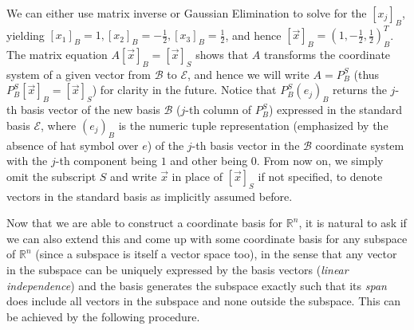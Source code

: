 \begin{solution}
We can either use matrix inverse or Gaussian Elimination to solve for the $[x_j]_B$, yielding $[x_1]_B = 1, [x_2]_B = -\frac{1}{2}, [x_3]_B = \frac{1}{2}$, and hence $[\vec{x}]_B = (1, -\frac{1}{2}, \frac{1}{2})^T_B$. The matrix equation $A[\vec{x}]_B = [\vec{x}]_S$ shows that $A$ transforms the coordinate system of a given vector from $\mathcal{B}$ to $\mathcal{E}$, and hence we will write $A = P_B^S$ (thus $P_B^S [\vec{x}]_B = [\vec{x}]_S$) for clarity in the future. Notice that $P_B^S (e_j)_B$ returns the $j$-th basis vector of the new basis $\mathcal{B}$ ($j$-th column of $P_B^S$) expressed in the standard basis $\mathcal{E}$, where $(e_j)_B$ is the numeric tuple representation (emphasized by the absence of hat symbol over $e$) of the $j$-th basis vector in the $\mathcal{B}$ coordinate system with the $j$-th component being $1$ and other being $0$. From now on, we simply omit the subscript $S$ and write $\vec{x}$ in place of $[\vec{x}]_S$ if not specified, to denote vectors in the standard basis as implicitly assumed before.
\end{solution}

Now that we are able to construct a coordinate basis for $\mathbb{R}^n$, it is natural to ask if we can also extend this and come up with some coordinate basis for any subspace of $\mathbb{R}^n$ (since a subspace is itself a vector space too), in the sense that any vector in the subspace can be uniquely expressed by the basis vectors (\textit{linear independence}) and the basis generates the subspace exactly such that its \textit{span} does include all vectors in the subspace and none outside the subspace. This can be achieved by the following procedure.

